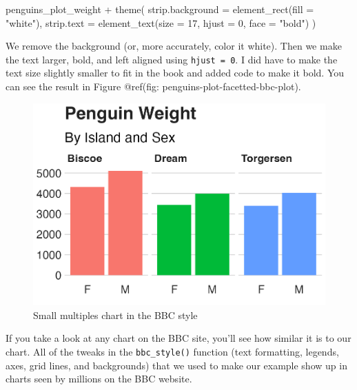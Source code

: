 \documentclass[
]{book}
\newenvironment{Shaded}{\begin{snugshade}}{\end{snugshade}}
\newcommand{\AttributeTok}[1]{\textcolor[rgb]{0.77,0.63,0.00}{#1}}
\newcommand{\DecValTok}[1]{\textcolor[rgb]{0.00,0.00,0.81}{#1}}
\newcommand{\FunctionTok}[1]{\textcolor[rgb]{0.00,0.00,0.00}{#1}}
\newcommand{\NormalTok}[1]{#1}
\newcommand{\SpecialCharTok}[1]{\textcolor[rgb]{0.00,0.00,0.00}{#1}}
\newcommand{\StringTok}[1]{\textcolor[rgb]{0.31,0.60,0.02}{#1}}
\begin{document}
\begin{Shaded}
\begin{Highlighting}[]
\NormalTok{penguins\_plot\_weight }\SpecialCharTok{+}
  \FunctionTok{theme}\NormalTok{(}
    \AttributeTok{strip.background =} \FunctionTok{element\_rect}\NormalTok{(}\AttributeTok{fill =} \StringTok{"white"}\NormalTok{),}
    \AttributeTok{strip.text =} \FunctionTok{element\_text}\NormalTok{(}\AttributeTok{size =} \DecValTok{17}\NormalTok{, }\AttributeTok{hjust =} \DecValTok{0}\NormalTok{, }\AttributeTok{face =} \StringTok{"bold"}\NormalTok{)}
\NormalTok{  )}
\end{Highlighting}
\end{Shaded}

We remove the background (or, more accurately, color it white). Then we make the text larger, bold, and left aligned using \texttt{hjust\ =\ 0}. I did have to make the text size slightly smaller to fit in the book and added code to make it bold. You can see the result in Figure @ref(fig: penguins-plot-facetted-bbc-plot).

\begin{figure}
\includegraphics[width=1\linewidth]{custom-theme_files/figure-latex/penguins-plot-facetted-bbc-plot-1} \caption{Small multiples chart in the BBC style}\label{fig:penguins-plot-facetted-bbc-plot}
\end{figure}

If you take a look at any chart on the BBC site, you'll see how similar it is to our chart. All of the tweaks in the \texttt{bbc\_style()} function (text formatting, legends, axes, grid lines, and backgrounds) that we used to make our example show up in charts seen by millions on the BBC website.
\end{document}
